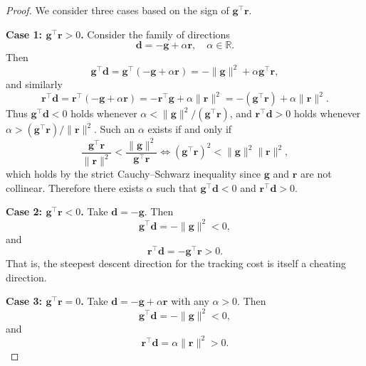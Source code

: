 \documentclass[10pt,a4paper]{amsart}
\begin{document}
\begin{proof}
We consider three cases based on the sign of 
$\mathbf{g}^\top\mathbf{r}$.


\medskip\noindent
\textbf{Case 1: $\mathbf{g}^\top \mathbf{r}>0$.}
Consider the family of directions
\begin{equation}\label{eq:family_pos}
\mathbf{d}=-\mathbf{g}+\alpha \mathbf{r}, \quad \alpha\in \mathbb{R}.
\end{equation}
Then
\begin{equation}
\mathbf{g}^\top \mathbf{d}=\mathbf{g}^\top(-\mathbf{g}+\alpha \mathbf{r})=-\|\mathbf{g}\|^2+\alpha \mathbf{g}^\top \mathbf{r},
\end{equation}
and similarly
\begin{equation}
\mathbf{r}^\top \mathbf{d}=\mathbf{r}^\top(-\mathbf{g}+\alpha \mathbf{r})=-\mathbf{r}^\top \mathbf{g}+\alpha\|\mathbf{r}\|^2
=-(\mathbf{g}^\top \mathbf{r})+\alpha\|\mathbf{r}\|^2.
\end{equation}
Thus $\mathbf{g}^\top \mathbf{d}<0$ holds whenever $\alpha<\|\mathbf{g}\|^2/(\mathbf{g}^\top \mathbf{r})$, and $\mathbf{r}^\top \mathbf{d}>0$ holds whenever
$\alpha>(\mathbf{g}^\top \mathbf{r})/\|\mathbf{r}\|^2$. Such an $\alpha$ exists if and only if
\begin{equation}
\frac{\mathbf{g}^\top \mathbf{r}}{\|\mathbf{r}\|^2}<\frac{\|\mathbf{g}\|^2}{\mathbf{g}^\top \mathbf{r}}
\iff (\mathbf{g}^\top \mathbf{r})^2 <\|\mathbf{g}\|^2\|\mathbf{r}\|^2,
\end{equation}
which holds by the strict Cauchy--Schwarz inequality since $\mathbf{g}$ and $\mathbf{r}$ are not collinear.
Therefore there exists $\alpha$ such that $\mathbf{g}^\top \mathbf{d}<0$ and $\mathbf{r}^\top \mathbf{d}>0$.

\medskip\noindent
\textbf{Case 2: $\mathbf{g}^\top \mathbf{r} < 0$.}
Take $\mathbf{d} = -\mathbf{g}$. Then
\begin{equation}
\mathbf{g}^\top\mathbf{d} = -\|\mathbf{g}\|^2 < 0,
\end{equation}
and
\begin{equation}
\mathbf{r}^\top\mathbf{d} = -\mathbf{g}^\top\mathbf{r} > 0.
\end{equation}
That is, the steepest descent direction for the tracking cost is itself
a cheating direction.

\medskip\noindent
\textbf{Case 3: $\mathbf{g}^\top \mathbf{r} = 0$.}
Take $\mathbf{d} = -\mathbf{g} + \alpha\mathbf{r}$ with any $\alpha > 0$. Then
\begin{equation}
\mathbf{g}^\top\mathbf{d} = -\|\mathbf{g}\|^2 < 0,
\end{equation}
and
\begin{equation}
\mathbf{r}^\top\mathbf{d} = \alpha\|\mathbf{r}\|^2 > 0.
\end{equation}





\end{proof}
\end{document}
